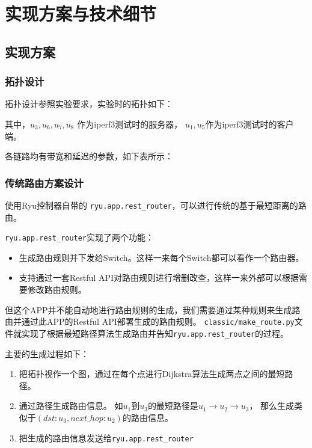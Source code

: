 \section{实现方案与技术细节}

\subsection{实现方案}

\subsubsection{拓扑设计}

拓扑设计参照实验要求，实验时的拓扑如下：



其中，$u_{3},u_{6},u_{7},u_{8}$ 作为iperf3测试时的服务器，
$u_{1},u_{5}$作为iperf3测试时的客户端。

各链路均有带宽和延迟的参数，如下表所示：



\subsubsection{传统路由方案设计}

使用Ryu控制器自带的 \texttt{ryu.app.rest\_router}，可以进行传统的基于最短距离的路由。

\texttt{ryu.app.rest\_router}实现了两个功能：

\begin{itemize}
	\item 生成路由规则并下发给Switch。这样一来每个Switch都可以看作一个路由器。
	\item 支持通过一套Restful API对路由规则进行增删改查，这样一来外部可以根据需要修改路由规则。
\end{itemize}

但这个APP并不能自动地进行路由规则的生成，我们需要通过某种规则来生成路由并通过此APP的Restful API部署生成的路由规则。
\texttt{classic/make\_route.py}文件就实现了根据最短路径算法生成路由并告知\texttt{ryu.app.rest\_router}的过程。

主要的生成过程如下：

\begin{enumerate}
	\item 把拓扑视作一个图，通过在每个点进行Dijkstra算法生成两点之间的最短路径。
	\item 通过路径生成路由信息。
如$u_1$到$u_3$的最短路径是$u_1 \rightarrow u_2 \rightarrow u_3$，
那么生成类似于$(dst:u_3, next\_hop:u_2)$的路由信息。
	\item 把生成的路由信息发送给\texttt{ryu.app.rest\_router}
\end{enumerate}

